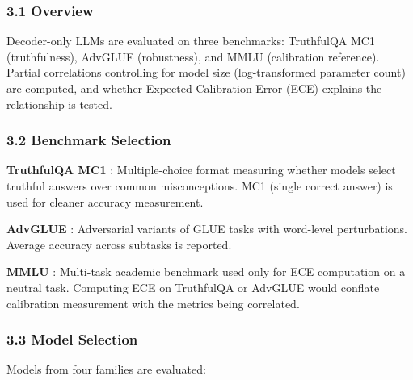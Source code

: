 
\subsubsection{3.1 Overview}

Decoder-only LLMs are evaluated on three benchmarks: TruthfulQA MC1 (truthfulness), AdvGLUE (robustness), and MMLU (calibration reference). Partial correlations controlling for model size (log-transformed parameter count) are computed, and whether Expected Calibration Error (ECE) explains the relationship is tested.

\subsubsection{3.2 Benchmark Selection}

\textbf{TruthfulQA MC1} \citep{lin2022truthfulqa}: Multiple-choice format measuring whether models select truthful answers over common misconceptions. MC1 (single correct answer) is used for cleaner accuracy measurement.

\textbf{AdvGLUE} \citep{wang2022advglue}: Adversarial variants of GLUE tasks with word-level perturbations. Average accuracy across subtasks is reported.

\textbf{MMLU} \citep{hendrycks2021mmlu}: Multi-task academic benchmark used only for ECE computation on a neutral task. Computing ECE on TruthfulQA or AdvGLUE would conflate calibration measurement with the metrics being correlated.

\subsubsection{3.3 Model Selection}

Models from four families are evaluated:

\begin{table}[htbp]
\centering
{}
\end{table}

